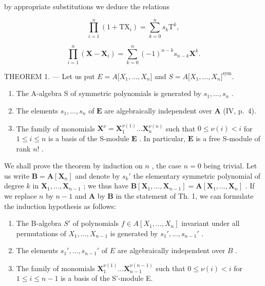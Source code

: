 by appropriate substitutions we deduce the relations

\[
\prod_ {i = 1} ^ {n} \left(1 + \mathrm{TX} _ {i}\right) = \sum_ {k = 0} ^ {n} s _ {k} \mathrm{T} ^ {k},\tag{3}
\]

\[
\prod_ {i = 1} ^ {n} \left(\mathbf {X} - \mathbf {X} _ {i}\right) = \sum_ {k = 0} ^ {n} (- 1) ^ {n - k} s _ {n - k} \mathbf {X} ^ {k}.\tag{4}
\]

THEOREM 1. --- Let us put \(E = A{[}X_{1}, \ldots, X_{n}{]}\) and \(S = A{[}X_{1}, \ldots, X_{n}{]}^{\text{sym}}\).

\begin{enumerate}
\def\labelenumi{\alph{enumi})}
\item
  The A-algebra S of symmetric polynomials is generated by \(s_1, \ldots, s_n\) .
\item
  The elements \(s_1, \ldots, s_n\) of \(\mathbf{E}\) are algebraically independent over \(\mathbf{A}\) (IV, p.~4).
\item
  The family of monomials \(\mathbf{X}^{\nu} = \mathbf{X}_1^{\nu(1)} \ldots \mathbf{X}_n^{\nu(n)}\) such that \(0 \leqslant \nu(i) < i\) for \(1 \leqslant i \leqslant n\) is a basis of the S-module \(\mathbf{E}\) . In particular, \(\mathbf{E}\) is a free S-module of rank \(n!\) .
\end{enumerate}

We shall prove the theorem by induction on \(n\) , the case \(n = 0\) being trivial. Let us write \(\mathbf{B} = \mathbf{A}[\mathbf{X}_n]\) and denote by \(s_k'\) the elementary symmetric polynomial of degree \(k\) in \(\mathbf{X}_1, \ldots, \mathbf{X}_{n-1}\) ; we thus have \(\mathbf{B}[\mathbf{X}_1, \ldots, \mathbf{X}_{n-1}] = \mathbf{A}[\mathbf{X}_1, \ldots, \mathbf{X}_n]\) . If we replace \(n\) by \(n-1\) and \(\mathbf{A}\) by \(\mathbf{B}\) in the statement of Th. 1, we can formulate the induction hypothesis as follows:

\begin{enumerate}
\def\labelenumi{(\Alph{enumi})}
\item
  The B-algebra \(S'\) of polynomials \(f \in A[X_1, \ldots, X_n]\) invariant under all permutations of \(X_1, \ldots, X_{n-1}\) is generated by \(s_1', \ldots, s_{n-1}'\) .
\item
  The elements \(s_1', \ldots, s_{n-1}'\) of \(E\) are algebraically independent over \(B\) .
\item
  The family of monomials \(\mathbf{X}_{1}^{\nu(1)}\ldots\mathbf{X}_{n-1}^{\nu(n-1)}\) such that \(0\leqslant\nu(i)<i\) for \(1\leqslant i\leqslant n-1\) is a basis of the S'-module E.
\end{enumerate}

